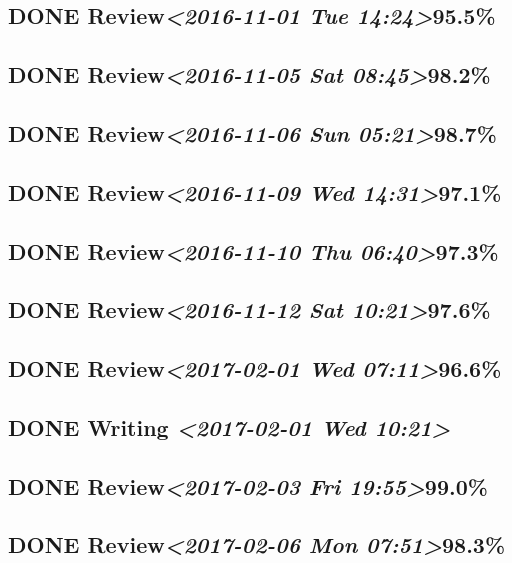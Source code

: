 \documentclass[11pt]{ctexart}
\begin{document}
\subsection{{\bfseries\sffamily DONE} Review\textit{<2016-11-01 Tue 14:24>}95.5\%}
\label{sec:org6e820e0}
\subsection{{\bfseries\sffamily DONE} Review\textit{<2016-11-05 Sat 08:45>}98.2\%}
\label{sec:orge3a7490}
\subsection{{\bfseries\sffamily DONE} Review\textit{<2016-11-06 Sun 05:21>}98.7\%}
\label{sec:orgbc110d2}
\subsection{{\bfseries\sffamily DONE} Review\textit{<2016-11-09 Wed 14:31>}97.1\%}
\label{sec:org4c425d4}
\subsection{{\bfseries\sffamily DONE} Review\textit{<2016-11-10 Thu 06:40>}97.3\%}
\label{sec:orgac0ae5f}
\subsection{{\bfseries\sffamily DONE} Review\textit{<2016-11-12 Sat 10:21>}97.6\%}
\label{sec:org3bb091d}
\subsection{{\bfseries\sffamily DONE} Review\textit{<2017-02-01 Wed 07:11>}96.6\%}
\label{sec:org5be0aaa}
\subsection{{\bfseries\sffamily DONE} Writing \textit{<2017-02-01 Wed 10:21>}}
\label{sec:org2af171a}
\subsection{{\bfseries\sffamily DONE} Review\textit{<2017-02-03 Fri 19:55>}99.0\%}
\label{sec:org60a5bd9}
\subsection{{\bfseries\sffamily DONE} Review\textit{<2017-02-06 Mon 07:51>}98.3\%}
\label{sec:org0593c17}
\end{document}
